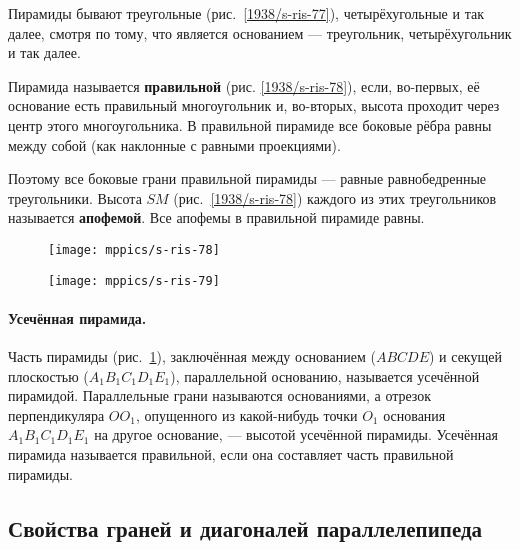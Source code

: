 Пирамиды бывают треугольные (рис.~\ref{1938/s-ris-77}), четырёхугольные и так далее, смотря по тому, что является основанием — треугольник, четырёхугольник и так далее.

Пирамида называется \textbf{правильной} (рис. \ref{1938/s-ris-78}), если, во-первых, её основание есть правильный многоугольник и, во-вторых, высота проходит через центр этого многоугольника.
В правильной пирамиде все боковые рёбра равны между собой (как наклонные с равными проекциями).

Поэтому все боковые грани правильной пирамиды — равные равнобедренные треугольники.
Высота $SM$ (рис.~\ref{1938/s-ris-78}) каждого из этих треугольников называется \textbf{апофемой}.
Все апофемы в правильной пирамиде равны.

\begin{figure}[!ht]
\begin{minipage}{.48\textwidth}
\centering
\texttt{[image: mppics/s-ris-78]}
\end{minipage}
\hfill
\begin{minipage}{.48\textwidth}
\centering
\texttt{[image: mppics/s-ris-79]}
\end{minipage}

\medskip

\begin{minipage}{.48\textwidth}
\centering
\caption{}\label{1938/s-ris-78}
\end{minipage}
\hfill
\begin{minipage}{.48\textwidth}
\centering
\caption{}\label{1938/s-ris-79}
\end{minipage}
\vskip-4mm
\end{figure}

\paragraph{Усечённая пирамида.}\label{1938/s71}
Часть пирамиды (рис.~\ref{1938/s-ris-79}), заключённая между основанием ($ABCDE$) и секущей плоскостью ($A_1B_1C_1D_1E_1$), параллельной основанию, называется усечённой пирамидой.
Параллельные грани называются основаниями, а отрезок перпендикуляра $OO_1$, опущенного из какой-нибудь точки $O_1$ основания $A_1B_1C_1D_1E_1$ на другое основание, — высотой усечённой пирамиды.
Усечённая пирамида называется правильной, если она составляет часть правильной пирамиды.


\subsection*{Свойства граней и диагоналей параллелепипеда}

